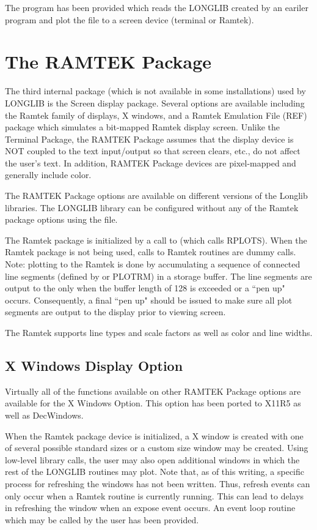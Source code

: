 \documentclass[11pt]{report}
\begin{document}
The program  has been provided which reads the
LONGLIB  created by an eariler program and plot the file
to a screen device (terminal or Ramtek).

\section{The RAMTEK Package}

The third internal package (which is not available in some
installations) used by LONGLIB is the  Screen display
package.  Several options are available including the Ramtek family of
displays, X windows, and a Ramtek Emulation File (REF) package which
simulates a bit-mapped Ramtek display screen.  Unlike the Terminal
Package, the RAMTEK Package assumes that the display device is NOT
coupled to the text input/output so that screen clears, etc., do not
affect the user's text.  In addition, RAMTEK Package devices are
pixel-mapped and generally include color.

The RAMTEK Package options are available on different versions of the
Longlib libraries. The LONGLIB library can be
configured without any of the Ramtek package options using
the  file.

The Ramtek package is initialized by a call to  (which calls
RPLOTS).  When the Ramtek package is not being used, calls to Ramtek
routines are dummy calls.  Note: plotting to the Ramtek is done by
accumulating a sequence of connected line segments (defined
by  or PLOTRM) in a storage buffer.  The line segments are
output to the  only when the buffer length of 128 is
exceeded or a ``pen up" occurs.  Consequently, a final ``pen up"
should be issued to make sure all plot segments are output to the
display prior to viewing screen.

The Ramtek supports line types and scale factors as well as color and
line widths.

\subsection{X Windows Display Option}

Virtually all of the functions available on other RAMTEK Package
options are available for the X Windows Option.  This option has been
ported to X11R5 as well as
DecWindows. 

When the Ramtek package device is initialized, a X window is created
with one of several possible standard sizes or a custom size window
may be created.  Using low-level library calls, the user may also open
additional windows in which the rest of the LONGLIB routines may plot.
Note that, as of this writing, a specific process for refreshing the
windows has not been written.  Thus, refresh events can only occur
when a Ramtek routine is currently running.  This can lead to delays
in refreshing the window when an expose event occurs.  An event loop
routine which may be called by the user has been provided.
\end{document}
